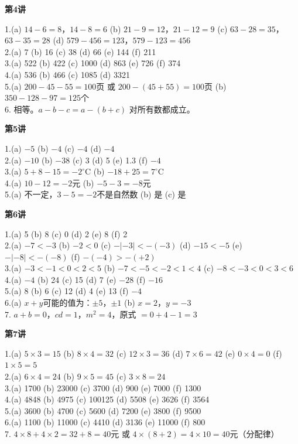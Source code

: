 
\textbf{第4讲}

1.(a) $14-6=8$，$14-8=6$ \quad (b) $21-9=12$，$21-12=9$ \quad (c) $63-28=35$，$63-35=28$ \quad (d) $579-456=123$，$579-123=456$\\
2.(a) 7 \quad (b) 16 \quad (c) 38 \quad (d) 66 \quad (e) 144 \quad (f) 211\\
3.(a) 522 \quad (b) 422 \quad (c) 1000 \quad (d) 863 \quad (e) 726 \quad (f) 374\\
4.(a) 536 \quad (b) 466 \quad (c) 1085 \quad (d) 3321\\
5.(a) $200-45-55=100$页 或 $200-(45+55)=100$页 \quad (b) $350-128-97=125$个\\
6. 相等。$a-b-c = a-(b+c)$ 对所有数都成立。

\textbf{第5讲}

1.(a) $-5$ \quad (b) $-4$ \quad (c) $-4$ \quad (d) $-4$\\
2.(a) $-10$ \quad (b) $-38$ \quad (c) 3 \quad (d) 5 \quad (e) 1.3 \quad (f) $-4$\\
3.(a) $5+8-15=-2^\circ$C \quad (b) $-18+25=7^\circ$C\\
4.(a) $10-12=-2$元 \quad (b) $-5-3=-8$元\\
5.(a) 不一定，$3-5=-2$不是自然数 \quad (b) 是 \quad (c) 是

\textbf{第6讲}

1.(a) 5 \quad (b) 8 \quad (c) 0 \quad (d) 2 \quad (e) 8 \quad (f) 2\\
2.(a) $-7 < -3$ \quad (b) $-2 < 0$ \quad (c) $-|{-3}| < -(-3)$ \quad (d) $-15 < -5$ \quad (e) $-|{-8}| < -(-8)$ \quad (f) $-(-4) > -(+2)$\\
3.(a) $-3 < -1 < 0 < 2 < 5$ \quad (b) $-7 < -5 < -2 < 1 < 4$ \quad (c) $-8 < -3 < 0 < 3 < 6$\\
4.(a) $-4$ \quad (b) 24 \quad (c) 15 \quad (d) 7 \quad (e) $-28$ \quad (f) $-16$\\
5.(a) 8 \quad (b) 6 \quad (c) 12 \quad (d) 4 \quad (e) 13 \quad (f) $-4$\\
6.(a) $x+y$可能的值为：$\pm5$，$\pm1$ \quad (b) $x=2$，$y=-3$\\
7. $a+b=0$，$cd=1$，$m^2=4$，原式 $=0+4-1=3$


\textbf{第7讲}

1.(a) $5\times3=15$ \quad (b) $8\times4=32$ \quad (c) $12\times3=36$ \quad (d) $7\times6=42$ \quad (e) $0\times4=0$ \quad (f) $1\times5=5$\\
2.(a) $6\times4=24$ \quad (b) $9\times5=45$ \quad (c) $3\times8=24$\\
3.(a) 1700 \quad (b) 23000 \quad (c) 3700 \quad (d) 900 \quad (e) 7000 \quad (f) 1300\\
4.(a) 4848 \quad (b) 4975 \quad (c) 100125 \quad (d) 5508 \quad (e) 3626 \quad (f) 3564\\
5.(a) 3600 \quad (b) 4700 \quad (c) 5600 \quad (d) 7200 \quad (e) 3800 \quad (f) 9500\\
6.(a) 1100 \quad (b) 11000 \quad (c) 4410 \quad (d) 3136 \quad (e) 11000 \quad (f) 800\\
7. $4\times8+4\times2=32+8=40$元 或 $4\times(8+2)=4\times10=40$元（分配律）

